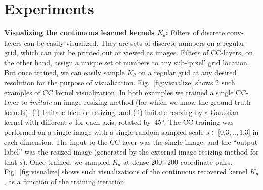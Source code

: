 \section{Experiments}
\vspace{-0.3cm}
\label{sec:applications}

\textbf{Visualizing the continuous learned kernels $K_\theta$:} Filters of discrete conv-layers can be easily visualized. They are sets of discrete numbers on a regular grid, which can just be printed out or viewed as images. Filters of CC-layers, on the other hand, assign a unique set of numbers to any sub-`pixel' grid location. But once trained,
we can easily sample $K_\theta$ on a regular grid at any desired resolution for the purpose of visualization. Fig.~\ref{fig:visualize} shows 2 such examples of CC kernel visualization. In both examples we trained a single CC-layer to \emph{imitate} an image-resizing method (for which we know the ground-truth kernels): (i) Imitate bicubic resizing, and (ii) imitate resizing by a Gaussian kernel with different $\sigma$ for each axis, rotated by~\ang{45}.  The CC-training was performed  on a single image with a single random sampled scale $s$$\in$$[0.3$$,..,$$1.3]$ in each dimension. The input to the CC-layer was the single image, and the ``output label'' was the resized image  (generated by the external image-resizing method for that $s$).  
Once trained, we sampled $K_\theta$ at dense 200$\times$200 coordinate-pairs.  Fig.~\ref{fig:visualize} shows such visualizations of the  continuous recovered kernel $K_\theta$,  as a function of the training iteration.


